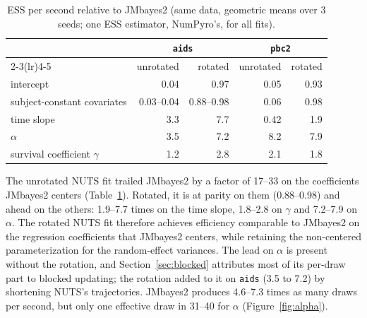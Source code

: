 \begin{table}[t]
\centering
\caption{ESS per second relative to JMbayes2 (same data, geometric means
over 3 seeds; one ESS estimator, NumPyro's, for all fits).}
\label{tab:jmb}
\small
\begin{tabular}{l rr rr}
\toprule
& \multicolumn{2}{c}{\texttt{aids}} & \multicolumn{2}{c}{\texttt{pbc2}} \\
\cmidrule(lr){2-3}\cmidrule(lr){4-5}
& unrotated & rotated & unrotated & rotated \\
\midrule
intercept & 0.04 & 0.97 & 0.05 & 0.93 \\
subject-constant covariates & 0.03--0.04 & 0.88--0.98 & 0.06 & 0.98 \\
time slope & 3.3 & 7.7 & 0.42 & 1.9 \\
$\alpha$ & 3.5 & 7.2 & 8.2 & 7.9 \\
survival coefficient $\gamma$ & 1.2 & 2.8 & 2.1 & 1.8 \\
\bottomrule
\end{tabular}
\end{table}

The unrotated NUTS fit trailed JMbayes2 by a factor of 17--33 on the
coefficients JMbayes2 centers (Table~\ref{tab:jmb}). Rotated, it is at
parity on them (0.88--0.98) and ahead on the others: 1.9--7.7 times on
the time slope, 1.8--2.8 on $\gamma$ and 7.2--7.9 on $\alpha$. The rotated NUTS fit therefore achieves efficiency comparable to JMbayes2 on the regression coefficients that JMbayes2 centers, while retaining the non-centered parameterization for the random-effect variances. The lead on $\alpha$ is present without the rotation, and Section~\ref{sec:blocked} attributes most of its per-draw part to blocked updating; the rotation added to it on \texttt{aids} (3.5 to 7.2) by shortening NUTS's trajectories. JMbayes2 produces 4.6--7.3 times as many draws per second, but only one effective draw in 31--40 for $\alpha$ (Figure~\ref{fig:alpha}).
